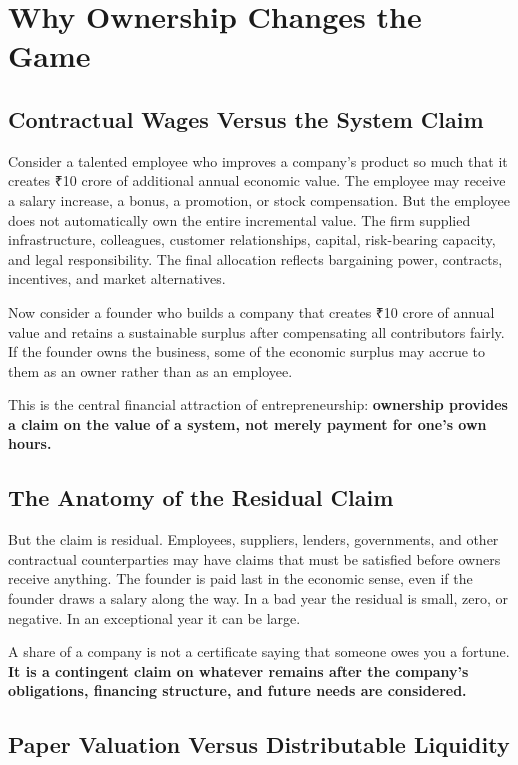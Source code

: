 \section{Why Ownership Changes the Game}

\subsection{Contractual Wages Versus the System Claim}

Consider a talented employee who improves a company's product so much that it creates ₹10 crore of additional annual economic value. The employee may receive a salary increase, a bonus, a promotion, or stock compensation. But the employee does not automatically own the entire incremental value. The firm supplied infrastructure, colleagues, customer relationships, capital, risk-bearing capacity, and legal responsibility. The final allocation reflects bargaining power, contracts, incentives, and market alternatives.

Now consider a founder who builds a company that creates ₹10 crore of annual value and retains a sustainable surplus after compensating all contributors fairly. If the founder owns the business, some of the economic surplus may accrue to them as an owner rather than as an employee.

This is the central financial attraction of entrepreneurship: \textbf{ownership provides a claim on the value of a system, not merely payment for one's own hours.}

\subsection{The Anatomy of the Residual Claim}

But the claim is residual. Employees, suppliers, lenders, governments, and other contractual counterparties may have claims that must be satisfied before owners receive anything. The founder is paid last in the economic sense, even if the founder draws a salary along the way. In a bad year the residual is small, zero, or negative. In an exceptional year it can be large.

A share of a company is not a certificate saying that someone owes you a fortune. \textbf{It is a contingent claim on whatever remains after the company's obligations, financing structure, and future needs are considered.}

\subsection{Paper Valuation Versus Distributable Liquidity}

